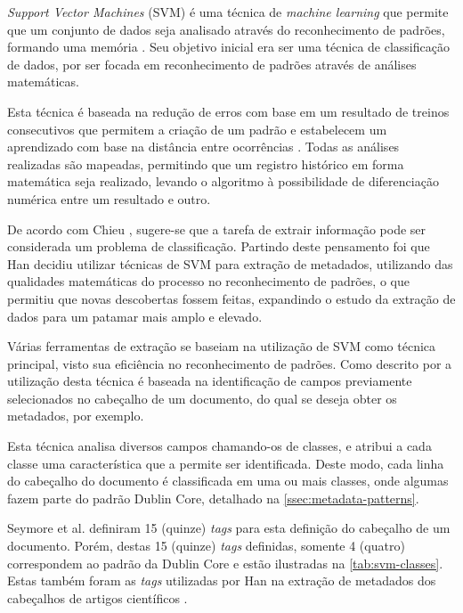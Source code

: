 \emph{Support Vector Machines} (SVM) é uma técnica de \textit{machine learning} que permite que um conjunto de dados seja analisado através do reconhecimento de padrões, formando uma memória \cite{Vapnik-SVM}. Seu objetivo inicial era ser uma técnica de classificação de dados, por ser focada em reconhecimento de padrões através de análises matemáticas.

Esta técnica é baseada na redução de erros com base em um resultado de treinos consecutivos que permitem a criação de um padrão e estabelecem um aprendizado com base na distância entre ocorrências \cite{Vapnik-SVM}. Todas as análises realizadas são mapeadas, permitindo que um registro histórico em forma matemática seja realizado, levando o algoritmo à possibilidade de diferenciação numérica entre um resultado e outro.

De acordo com Chieu \cite{Chieu}, sugere-se que a tarefa de extrair informação pode ser considerada um problema de classificação. Partindo deste pensamento foi que Han \cite{Han-SVM} decidiu utilizar técnicas de SVM para extração de metadados, utilizando das qualidades matemáticas do processo no reconhecimento de padrões, o que permitiu que novas descobertas fossem feitas, expandindo o estudo da extração de dados para um patamar mais amplo e elevado.

Várias ferramentas de extração se baseiam na utilização de SVM como técnica principal, visto sua eficiência no reconhecimento de padrões. Como descrito por \cite{Han-SVM} a utilização desta técnica é baseada na identificação de campos previamente selecionados no cabeçalho de um documento, do qual se deseja obter os metadados, por exemplo.

Esta técnica analisa diversos campos chamando-os de classes, e atribui a cada classe uma característica que a permite ser identificada. Deste modo, cada linha do cabeçalho do documento é classificada em uma ou mais classes, onde algumas fazem parte do padrão Dublin Core, detalhado na \autoref{ssec:metadata-patterns}.

Seymore et al. \cite{Seymore-HMM-IE} definiram 15 (quinze) \textit{tags} para esta definição do cabeçalho de um documento. Porém, destas 15 (quinze) \textit{tags} definidas, somente 4 (quatro) correspondem ao padrão da Dublin Core e estão ilustradas na \autoref{tab:svm-classes}. Estas também foram as \textit{tags} utilizadas por Han na extração de metadados dos cabeçalhos de artigos científicos \cite{Han-SVM}.


